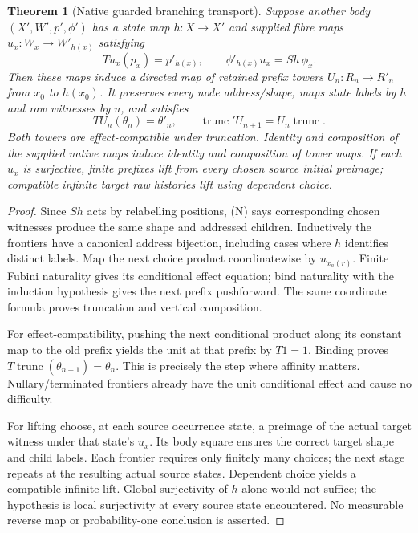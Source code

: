 \documentclass[11pt]{article}
\newtheorem{theorem}{Theorem}\newtheorem{proposition}{Proposition}
\begin{document}
\begin{theorem}[Native guarded branching transport]
Suppose another body $(X',W',p',\phi')$ has a state map $h:X\to X'$ and supplied fibre maps $u_x:W_x\to W'_{h(x)}$ satisfying
\[
 Tu_x(p_x)=p'_{h(x)},\qquad
 \phi'_{h(x)}u_x=S h\,\phi_x.\tag{N}
\]
Then these maps induce a directed map of retained prefix towers $U_n:R_n\to R'_n$ from $x_0$ to $h(x_0)$. It preserves every node address/shape, maps state labels by $h$ and raw witnesses by $u$, and satisfies
\[
 T U_n(\theta_n)=\theta'_n,\qquad
 \operatorname{trunc}'U_{n+1}=U_n\operatorname{trunc}.
\]
Both towers are effect-compatible under truncation. Identity and composition of the supplied native maps induce identity and composition of tower maps. If each $u_x$ is surjective, finite prefixes lift from every chosen source initial preimage; compatible infinite target raw histories lift using dependent choice.
\end{theorem}
\begin{proof}
Since $S h$ acts by relabelling positions, (N) says corresponding chosen witnesses produce the same shape and addressed children. Inductively the frontiers have a canonical address bijection, including cases where $h$ identifies distinct labels. Map the next choice product coordinatewise by $u_{x_a(r)}$. Finite Fubini naturality gives its conditional effect equation; bind naturality with the induction hypothesis gives the next prefix pushforward. The same coordinate formula proves truncation and vertical composition.

For effect-compatibility, pushing the next conditional product along its constant map to the old prefix yields the unit at that prefix by $T1=1$. Binding proves $T\operatorname{trunc}(\theta_{n+1})=\theta_n$. This is precisely the step where affinity matters. Nullary/terminated frontiers already have the unit conditional effect and cause no difficulty.

For lifting choose, at each source occurrence state, a preimage of the actual target witness under that state's $u_x$. Its body square ensures the correct target shape and child labels. Each frontier requires only finitely many choices; the next stage repeats at the resulting actual source states. Dependent choice yields a compatible infinite lift. Global surjectivity of $h$ alone would not suffice; the hypothesis is local surjectivity at every source state encountered. No measurable reverse map or probability-one conclusion is asserted.
\end{proof}
\end{document}
